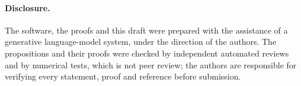 \paragraph{Disclosure.} The software, the proofs and this draft were prepared with the assistance of a generative
language-model system, under the direction of the authors. The propositions and their proofs were checked by
independent automated reviews and by numerical tests, which is not peer review; the authors are responsible for
verifying every statement, proof and reference before submission. 
